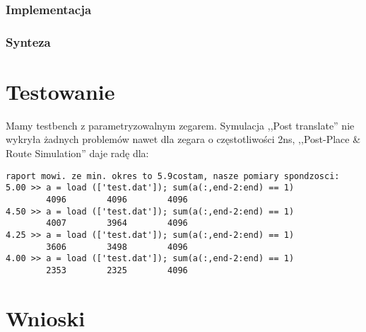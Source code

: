 \documentclass[a4paper]{article}
\begin{document}
\subsubsection{Implementacja}
\subsubsection{Synteza}
\clearpage
\section{Testowanie}
Mamy testbench z parametryzowalnym zegarem. Symulacja ,,Post translate'' nie wykryła żadnych problemów nawet dla zegara o częstotliwości 2ns, ,,Post-Place \& Route Simulation'' daje radę dla:
\begin{verbatim}
raport mowi. ze min. okres to 5.9costam, nasze pomiary spondzosci:
5.00 >> a = load (['test.dat']); sum(a(:,end-2:end) == 1)
        4096        4096        4096
4.50 >> a = load (['test.dat']); sum(a(:,end-2:end) == 1)
        4007        3964        4096
4.25 >> a = load (['test.dat']); sum(a(:,end-2:end) == 1)
        3606        3498        4096
4.00 >> a = load (['test.dat']); sum(a(:,end-2:end) == 1)
        2353        2325        4096
\end{verbatim}
\section{Wnioski}
\end{document}
